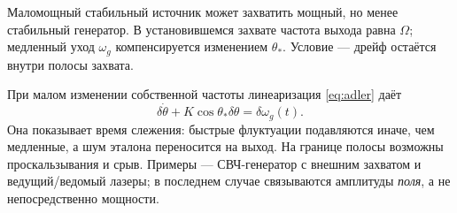 Маломощный стабильный источник может захватить мощный, но менее стабильный генератор. В установившемся захвате частота выхода равна $\Omega$; медленный уход $\omega_g$ компенсируется изменением $\theta_*$. Условие --- дрейф остаётся внутри полосы захвата.

При малом изменении собственной частоты линеаризация \eqref{eq:adler} даёт
\begin{equation}
 \delta\dot\theta+K\cos\theta_*\delta\theta=\delta\omega_g(t).
\end{equation}
Она показывает время слежения: быстрые флуктуации подавляются иначе, чем медленные, а шум эталона переносится на выход. На границе полосы возможны проскальзывания и срыв. Примеры --- СВЧ-генератор с внешним захватом и ведущий/ведомый лазеры; в последнем случае связываются амплитуды \emph{поля}, а не непосредственно мощности.
